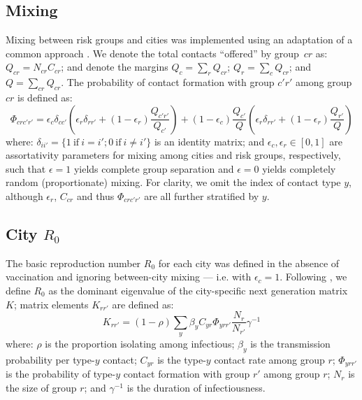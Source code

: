 \subsection{Mixing}\label{app.model.mix}
Mixing between risk groups and cities was implemented using
an adaptation of a common approach \cite{Nold1980,Garnett1994}.
We denote the total contacts ``offered'' by group~$cr$ as: $Q_{cr} = N_{cr} C_{cr}$;
and denote the margins $Q_{c} = \sum_{r}Q_{cr}$; $Q_{r} = \sum_{c} Q_{cr}$; and $Q = \sum_{cr}Q_{cr}$.
The probability of contact formation with group $c'r'$ among group $cr$ is defined as:
\begin{equation}
  \Phi_{crc'r'} =
    \epsilon_c \delta_{cc'} \left(
      \epsilon_r \delta_{rr'} + (1 - \epsilon_r) \frac{Q_{c'r'}}{Q_{c'}}
    \right) +
    (1 - \epsilon_{c}) \frac{Q_{c'}}{Q} \left(
      \epsilon_r \delta_{rr'} + (1 - \epsilon_r) \frac{Q_{r'}}{Q}
    \right)
\end{equation}
where:
$\delta_{ii'} = \{1~\text{if}~i = i'; 0~\text{if}~i \ne i'\}$ is an identity matrix; and
$\epsilon_{c}, \epsilon_{r} \in [0,1]$ are assortativity parameters
for mixing among cities and risk groups, respectively, such that
$\epsilon = 1$ yields complete group separation and
$\epsilon = 0$ yields completely random (proportionate) mixing.
For clarity, we omit the index of contact type $y$,
although $\epsilon_r$, $C_{cr}$ and thus $\Phi_{crc'r'}$ are all further stratified by $y$.
\subsection{City $R_0$}\label{app.model.R0}
The basic reproduction number $R_0$ for each city was defined
in the absence of vaccination and ignoring between-city mixing --- i.e. with $\epsilon_c = 1$.
Following \cite{Diekmann1990}, we define $R_0$ as
the dominant eigenvalue of the city-specific next generation matrix $K$;
matrix elements $K_{rr'}$ are defined as:
\begin{equation}
  K_{rr'} = (1 - \rho) \sum_{y} \beta_{y} C_{yr} \Phi_{yrr'} \frac{N_{r}} {N_{r'}} \gamma^{-1}
\end{equation}
where:
$\rho$ is the proportion isolating among infectious;
$\beta_{y}$ is the transmission probability per type-$y$ contact;
$C_{yr}$ is the type-$y$ contact rate among group $r$;
$\Phi_{yrr'}$ is the probability of type-$y$ contact formation with group $r'$ among group $r$;
$N_{r}$ is the size of group $r$; and
$\gamma^{-1}$ is the duration of infectiousness.
